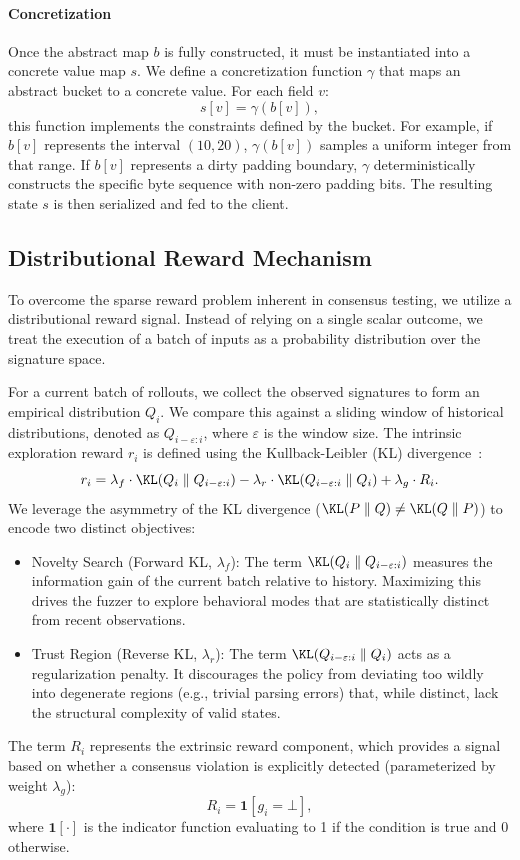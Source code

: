 \paragraph{Concretization}
Once the abstract map $b$ is fully constructed, it must be instantiated into a concrete value map $s$. We define a concretization function $\gamma$ that maps an abstract bucket to a concrete value. For each field $v$:
\[
    s[v] = \gamma(b[v]),
\]
this function implements the constraints defined by the bucket. For example, if $b[v]$ represents the interval $(10, 20)$, $\gamma(b[v])$ samples a uniform integer from that range. If $b[v]$ represents a dirty padding boundary, $\gamma$ deterministically constructs the specific byte sequence with non-zero padding bits. The resulting state $s$ is then serialized and fed to the client.

\subsection{Distributional Reward Mechanism}

To overcome the sparse reward problem inherent in consensus testing, we utilize a distributional reward signal. Instead of relying on a single scalar outcome, we treat the execution of a batch of inputs as a probability distribution over the signature space.

For a current batch of rollouts, we collect the observed signatures to form an empirical distribution $Q_i$. We compare this against a sliding window of historical distributions, denoted as $Q_{i-\varepsilon:i}$, where $\varepsilon$ is the window size. The intrinsic exploration reward $r_i$ is defined using the Kullback-Leibler (KL) divergence~\cite{kullback1951information}:
\[
    r_i = \lambda_f \cdot \KL(Q_i \parallel Q_{i-\varepsilon:i}) - \lambda_r \cdot \KL(Q_{i-\varepsilon:i} \parallel Q_i) + \lambda_g \cdot R_i.
\]
We leverage the asymmetry of the KL divergence ($\KL(P \parallel Q) \neq \KL(Q \parallel P)$) to encode two distinct objectives:
\begin{itemize}
    \item Novelty Search (Forward KL, $\lambda_f$): The term $\KL(Q_i \parallel Q_{i-\varepsilon:i})$ measures the information gain of the current batch relative to history. Maximizing this drives the fuzzer to explore behavioral modes that are statistically distinct from recent observations.
    \item Trust Region (Reverse KL, $\lambda_r$): The term $\KL(Q_{i-\varepsilon:i} \parallel Q_i)$ acts as a regularization penalty. It discourages the policy from deviating too wildly into degenerate regions (e.g., trivial parsing errors) that, while distinct, lack the structural complexity of valid states.
\end{itemize}
The term $R_i$ represents the extrinsic reward component, which provides a signal based on whether a consensus violation is explicitly detected (parameterized by weight $\lambda_g$):
\[
    R_i = \mathbf{1}[g_i = \bot],
\]
where $\mathbf{1}[\cdot]$ is the indicator function evaluating to 1 if the condition is true and 0 otherwise.

